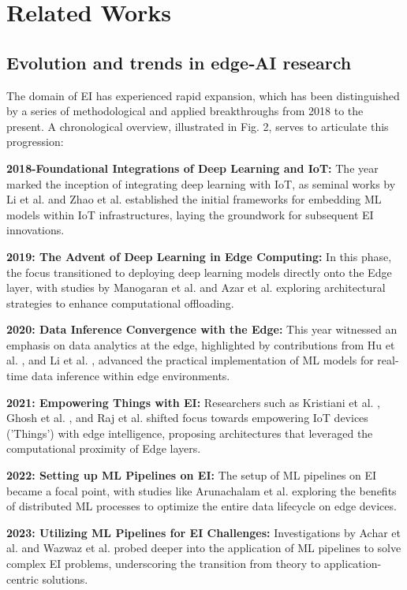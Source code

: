 \section{Related Works}
\label{Related Works}
	\subsection{ Evolution and trends in edge‑AI research }
	The domain of EI has experienced rapid expansion, which has been distinguished
	by a series of methodological and applied breakthroughs from 2018 to the present.
	A chronological overview, illustrated in Fig. 2, serves to articulate this progression:
	
	\textbf{2018-Foundational Integrations of Deep Learning and IoT:} The year marked the inception of integrating deep learning with IoT, as seminal works by Li et al. \cite{c25} and Zhao et al. \cite{c26} established the initial frameworks for embedding ML models within IoT infrastructures, laying the groundwork for subsequent EI innovations.
	
	\textbf{2019: The Advent of Deep Learning in Edge Computing:} In this phase, the focus transitioned to deploying deep learning models directly onto the Edge layer, with studies by Manogaran et al. \cite{c27} and Azar et al. \cite{c28} exploring architectural strategies to enhance computational offloading.
	
	\textbf{2020: Data Inference Convergence with the Edge:} This year witnessed an emphasis on data analytics at the edge, highlighted by contributions from Hu et al. \cite{c29}, and Li et al. \cite{c14}, advanced the practical implementation of ML models for real-time data inference within edge environments.
	
	\textbf{2021: Empowering Things with EI:} Researchers such as Kristiani et al. \cite{c31}, Ghosh et al. \cite{c9}, and Raj et al. \cite{c32} shifted focus towards empowering IoT devices ('Things') with edge intelligence, proposing architectures that leveraged the computational proximity of Edge layers.
	
	\textbf{2022: Setting up ML Pipelines on EI:} The setup of ML pipelines on EI became a focal point, with studies like Arunachalam et al. \cite{c33} exploring the benefits of distributed ML processes to optimize the entire data lifecycle on edge devices.
	
	\textbf{2023: Utilizing ML Pipelines for EI Challenges:} Investigations by Achar et al. \cite{c16} and Wazwaz et al. \cite{c17} probed deeper into the application of ML pipelines to solve complex EI problems, underscoring the transition from theory to application-centric solutions.
	
